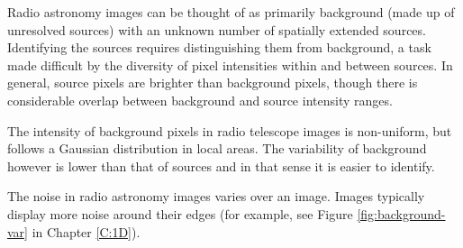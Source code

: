 Radio astronomy images can be thought of as primarily background (made up of unresolved sources) with an unknown number of spatially extended sources. Identifying the sources requires distinguishing them from background, a task made difficult by the diversity of pixel intensities within and between sources. In general, source pixels are brighter than background pixels, though there is considerable overlap between background and source intensity ranges. 

The intensity of background pixels in radio telescope images is non-uniform, but follows a Gaussian distribution in local areas. The variability of background however is lower than that of sources and in that sense it is easier to identify.

The noise in radio astronomy images varies over an image. Images typically display more noise around their edges (for example, see Figure \ref{fig:background-var} in Chapter \ref{C:1D}).

